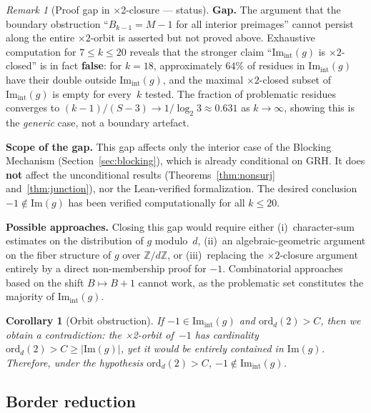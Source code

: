 \documentclass[12pt, a4paper]{amsart}
\theoremstyle{plain}
\newtheorem{corollary}[theorem]{Corollary}
\theoremstyle{definition}
\theoremstyle{remark}
\newtheorem{remark}[theorem]{Remark}
\newcommand{\ord}{\mathrm{ord}}
\begin{document}
\begin{remark}[Proof gap in ×2-closure — status]\label{rem:closure-gap}
  \textbf{Gap.}\enspace
  The argument that the boundary obstruction
  ``$B_{k-1} = M - 1$ for all interior preimages'' cannot
  persist along the entire $\times 2$-orbit is asserted but
  not proved above. Exhaustive computation for
  $7 \leq k \leq 20$ reveals that the stronger claim
  ``$\mathrm{Im}_{\mathrm{int}}(g)$ is $\times 2$-closed''
  is in fact \textbf{false}: for $k = 18$, approximately
  $64\%$ of residues in $\mathrm{Im}_{\mathrm{int}}(g)$
  have their double outside
  $\mathrm{Im}_{\mathrm{int}}(g)$, and the maximal
  $\times 2$-closed subset of
  $\mathrm{Im}_{\mathrm{int}}(g)$ is empty for every~$k$
  tested. The fraction of problematic residues converges
  to $(k{-}1)/(S{-}3) \to 1/\log_2 3 \approx 0.631$ as
  $k \to \infty$, showing this is the \emph{generic} case,
  not a boundary artefact.

  \textbf{Scope of the gap.}\enspace
  This gap affects only the interior case of the
  Blocking Mechanism (Section~\ref{sec:blocking}), which
  is already conditional on GRH.
  It does \textbf{not} affect the unconditional results
  (Theorems~\ref{thm:nonsurj} and~\ref{thm:junction}),
  nor the Lean-verified formalization.
  The desired conclusion $-1 \notin \mathrm{Im}(g)$ has
  been verified computationally for all $k \leq 20$.

  \textbf{Possible approaches.}\enspace
  Closing this gap would require either (i)~character-sum
  estimates on the distribution of $g$ modulo~$d$,
  (ii)~an algebraic-geometric argument on the fiber
  structure of $g$ over $\mathbb{Z}/d\mathbb{Z}$, or
  (iii)~replacing the $\times 2$-closure argument entirely
  by a direct non-membership proof for $-1$. Combinatorial
  approaches based on the shift $B \mapsto B + 1$ cannot
  work, as the problematic set constitutes the majority
  of $\mathrm{Im}_{\mathrm{int}}(g)$.
\end{remark}

\begin{corollary}[Orbit obstruction]\label{cor:orbit}
  If $-1 \in \mathrm{Im}_{\mathrm{int}}(g)$ and
  $\ord_d(2) > C$, then we obtain a contradiction:
  the ×2-orbit of~$-1$ has cardinality $\ord_d(2) > C \geq
  |\mathrm{Im}(g)|$, yet it would be entirely contained
  in $\mathrm{Im}(g)$.
  Therefore, under the hypothesis $\ord_d(2) > C$,
  $-1 \notin \mathrm{Im}_{\mathrm{int}}(g)$.
\end{corollary}

\subsection{Border reduction}\label{ssec:border}
\end{document}

